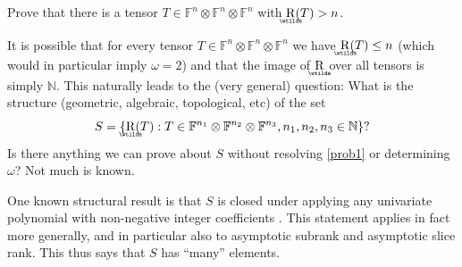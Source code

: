 \documentclass{daj}
\DeclareMathOperator{\asymprank}{\underaccent{\wtilde}{R}}
\newcommand{\FF}{\mathbb{F}}
\newcommand{\NN}{\mathbb{N}}
\begin{document}
\begin{problem}\label{prob1}
    Prove that there is a tensor $T \in \FF^n \otimes \FF^n \otimes \FF^n$ with $\asymprank(T) > n$.
\end{problem}




It is possible that for every  %
tensor $T \in \FF^n \otimes \FF^n \otimes \FF^n$ we have $\asymprank(T) \leq n$ (which would in particular imply $\omega=2$) and that the image of $\asymprank$ over all tensors is simply $\NN$. This naturally leads to the (very general) question:
    What is the structure (geometric, algebraic, topological, etc) of the set
    \[
    S = \{\asymprank(T) : T \in \FF^{n_1} \otimes \FF^{n_2} \otimes \FF^{n_3}, n_1, n_2, n_3 \in \NN\}?
    \]
Is there anything we can prove about $S$ without resolving \autoref{prob1} or determining~$\omega$? Not much is known. 

One known structural result is that $S$ is closed under applying any univariate polynomial with non-negative integer coefficients \cite[Theorem 4.8]{wigderson2022asymptotic}. This statement applies in fact more generally, and in particular also to asymptotic subrank and asymptotic slice rank. This thus says that $S$ has ``many'' elements. 
\end{document}

